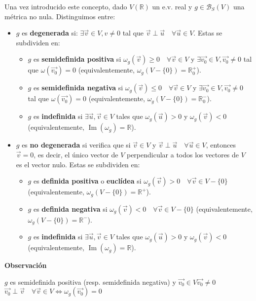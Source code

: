 \documentclass[x11names,table]{report}
\DeclareMathOperator{\im}{Im}
\begin{document}
Una vez introducido este concepto, dado $V(\mathbb{R})$ un e.v. real y $g\in\mathcal{B}_S(V)$ una métrica no nula. Distinguimos entre:
\begin{itemize}
\item $g$ es \textbf{degenerada} si: $\exists\vec{v}\in V, v\not=0$ tal que $\vec{v}\perp\vec{u} \quad \forall\vec{u}\in V$. Estas se subdividen en:
\begin{itemize}
\item $g$ es \textbf{semidefinida positiva} si $\omega_g(\vec{v})\geq 0\quad\forall\vec{v}\in V$ y $\exists\vec{v_0}\in V, \vec{v_0}\not= 0$ tal que $\omega(\vec{v_0})=0$ (equivalentemente, $\omega_g(V-\{0\})=\mathbb{R}_0^+$).
\item $g$ es \textbf{semidefinida negativa} si $\omega_g(\vec{v})\leq 0\quad\forall\vec{v}\in V$ y $\exists\vec{v_0}\in V, \vec{v_0}\not= 0$ tal que $\omega(\vec{v_0})=0$ (equivalentemente, $\omega_g(V-\{0\})=\mathbb{R}_0^-$).
\item $g$ es \textbf{indefinida} si $\exists \vec{u},\vec{v}\in V$ tales que $\omega_g(\vec{u})>0$ y $\omega_g(\vec{v})<0$ (equivalentemente, $\im(\omega_g)=\mathbb{R}$).
\end{itemize}
\item $g$ es \textbf{no degenerada} si verifica que si $\vec{v}\in V$ y $\vec{v}\perp\vec{u}\quad\forall\vec{u}\in V$, entonces $\vec{v}=0$, es decir, el único vector de $V$ perpendicular a todos los vectores de $V$ es el vector nulo. Estas se subdividen en:
\begin{itemize}
\item $g$ es \textbf{definida positiva} o \textbf{euclídea} si $\omega_g(\vec{v})> 0\quad\forall\vec{v}\in V-\{0\}$ (equivalentemente, $\omega_g(V-\{0\})=\mathbb{R}^+$).
\item $g$ es \textbf{definida negativa} si $\omega_g(\vec{v})<0\quad\forall\vec{v}\in V-\{0\}$ (equivalentemente, $\omega_g(V-\{0\})=\mathbb{R}^-$).
\item $g$ es \textbf{indefinida} si $\exists \vec{u},\vec{v}\in V$ tales que $\omega_g(\vec{u})>0$ y $\omega_g(\vec{v})<0$ (equivalentemente, $\im(\omega_g)=\mathbb{R}$).
\end{itemize}
\end{itemize}

\textbf{Observación}

$g$ es semidefinida positiva (resp. semidefinida negativa) y $\vec{v_0}\in V\vec{v_0}\not=0$
$\vec{v_0}\perp\vec{v}\quad\forall\vec{v}\in V\Longleftrightarrow\omega_g(\vec{v_0})=0$
\end{document}
